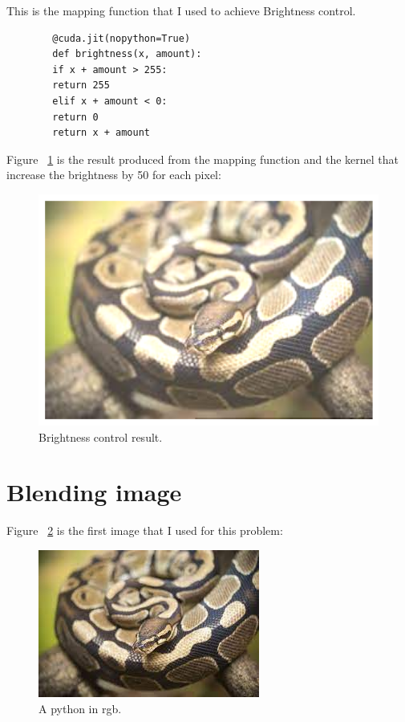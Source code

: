 \documentclass{article}
\begin{document}
	This is the mapping function that I used to achieve Brightness control.
	
	\begin{verbatim}
		@cuda.jit(nopython=True)
		def brightness(x, amount):
		if x + amount > 255:
		return 255
		elif x + amount < 0:
		return 0
		return x + amount
	\end{verbatim}
	
	Figure ~\ref{fig:brightness_control} is the result produced from the mapping function and the kernel that increase the brightness by 50 for each pixel:
	
	\begin{figure}
		\includegraphics[width=\linewidth]{brightness_control.png}
		\caption{Brightness control result.}
		\label{fig:brightness_control}
	\end{figure}
	
	\section{Blending image}
	Figure ~\ref{fig:python} is the first image that I used for this problem:
	
	\begin{figure}
		\includegraphics[width=\linewidth]{python.jpg}
		\caption{A python in rgb.}
		\label{fig:python}
	\end{figure}
	
\end{document}
